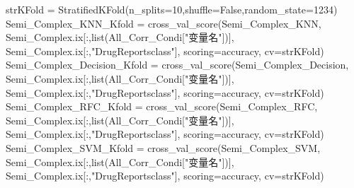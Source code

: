 \documentclass[
]{article}
\newenvironment{Shaded}{}{}
\newcommand{\BuiltInTok}[1]{#1}
\newcommand{\DecValTok}[1]{\textcolor[rgb]{0.25,0.63,0.44}{#1}}
\newcommand{\NormalTok}[1]{#1}
\newcommand{\OperatorTok}[1]{\textcolor[rgb]{0.40,0.40,0.40}{#1}}
\newcommand{\StringTok}[1]{\textcolor[rgb]{0.25,0.44,0.63}{#1}}
\newcommand{\VariableTok}[1]{\textcolor[rgb]{0.10,0.09,0.49}{#1}}
\begin{document}
\begin{Shaded}
\begin{Highlighting}[]
\NormalTok{strKFold }\OperatorTok{=}\NormalTok{ StratifiedKFold(n\_splits}\OperatorTok{=}\DecValTok{10}\NormalTok{,shuffle}\OperatorTok{=}\VariableTok{False}\NormalTok{,random\_state}\OperatorTok{=}\DecValTok{1234}\NormalTok{)}
\NormalTok{Semi\_Complex\_KNN\_Kfold }\OperatorTok{=}\NormalTok{ cross\_val\_score(Semi\_Complex\_KNN,}
\NormalTok{                            Semi\_Complex.ix[:,}\BuiltInTok{list}\NormalTok{(All\_Corr\_Condi[}\StringTok{"变量名"}\NormalTok{])],}
\NormalTok{                            Semi\_Complex.ix[:,}\StringTok{"DrugReportsclass"}\NormalTok{],}
\NormalTok{                            scoring}\OperatorTok{=}\StringTok{\textquotesingle{}accuracy\textquotesingle{}}\NormalTok{,}
\NormalTok{                            cv}\OperatorTok{=}\NormalTok{strKFold)}
\NormalTok{Semi\_Complex\_Decision\_Kfold }\OperatorTok{=}\NormalTok{ cross\_val\_score(Semi\_Complex\_Decision,}
\NormalTok{                            Semi\_Complex.ix[:,}\BuiltInTok{list}\NormalTok{(All\_Corr\_Condi[}\StringTok{"变量名"}\NormalTok{])],}
\NormalTok{                            Semi\_Complex.ix[:,}\StringTok{"DrugReportsclass"}\NormalTok{],}
\NormalTok{                            scoring}\OperatorTok{=}\StringTok{\textquotesingle{}accuracy\textquotesingle{}}\NormalTok{,}
\NormalTok{                            cv}\OperatorTok{=}\NormalTok{strKFold)}
\NormalTok{Semi\_Complex\_RFC\_Kfold }\OperatorTok{=}\NormalTok{ cross\_val\_score(Semi\_Complex\_RFC,}
\NormalTok{                            Semi\_Complex.ix[:,}\BuiltInTok{list}\NormalTok{(All\_Corr\_Condi[}\StringTok{"变量名"}\NormalTok{])],}
\NormalTok{                            Semi\_Complex.ix[:,}\StringTok{"DrugReportsclass"}\NormalTok{],}
\NormalTok{                            scoring}\OperatorTok{=}\StringTok{\textquotesingle{}accuracy\textquotesingle{}}\NormalTok{,}
\NormalTok{                            cv}\OperatorTok{=}\NormalTok{strKFold)}
\NormalTok{Semi\_Complex\_SVM\_Kfold }\OperatorTok{=}\NormalTok{ cross\_val\_score(Semi\_Complex\_SVM,}
\NormalTok{                            Semi\_Complex.ix[:,}\BuiltInTok{list}\NormalTok{(All\_Corr\_Condi[}\StringTok{"变量名"}\NormalTok{])],}
\NormalTok{                            Semi\_Complex.ix[:,}\StringTok{"DrugReportsclass"}\NormalTok{],}
\NormalTok{                            scoring}\OperatorTok{=}\StringTok{\textquotesingle{}accuracy\textquotesingle{}}\NormalTok{,}
\NormalTok{                            cv}\OperatorTok{=}\NormalTok{strKFold)}

\end{Highlighting}
\end{Shaded}
\end{document}
